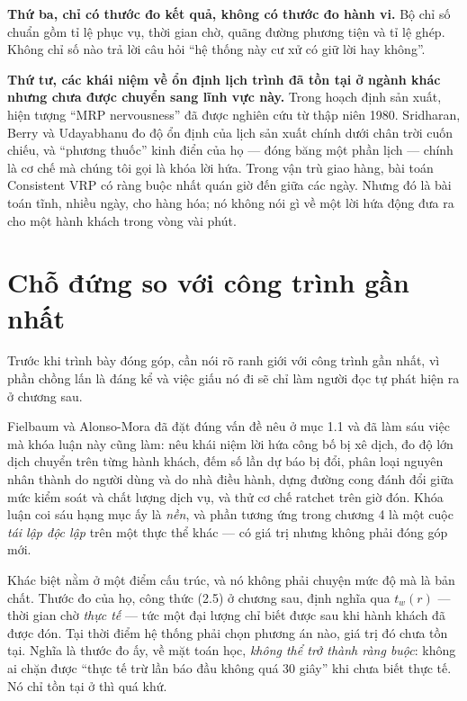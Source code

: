 \textbf{Thứ ba, chỉ có thước đo kết quả, không có thước đo hành vi.} Bộ chỉ số chuẩn gồm tỉ lệ
phục vụ, thời gian chờ, quãng đường phương tiện và tỉ lệ ghép. Không chỉ số nào trả lời câu hỏi
``hệ thống này cư xử có giữ lời hay không''.

\textbf{Thứ tư, các khái niệm về ổn định lịch trình đã tồn tại ở ngành khác nhưng chưa được
chuyển sang lĩnh vực này.} Trong hoạch định sản xuất, hiện tượng ``MRP nervousness'' đã được
nghiên cứu từ thập niên 1980. Sridharan, Berry và Udayabhanu \cite{sridharan1987} đo độ ổn định
của lịch sản xuất chính dưới chân trời cuốn chiếu, và ``phương thuốc'' kinh điển của họ ---
đóng băng một phần lịch --- chính là cơ chế mà chúng tôi gọi là khóa lời hứa. Trong vận trù
giao hàng, bài toán Consistent VRP \cite{kovacs2014} có ràng buộc nhất quán giờ đến giữa các
ngày. Nhưng đó là bài toán tĩnh, nhiều ngày, cho hàng hóa; nó không nói gì về một lời hứa động
đưa ra cho một hành khách trong vòng vài phút.

\section{Chỗ đứng so với công trình gần nhất}

Trước khi trình bày đóng góp, cần nói rõ ranh giới với công trình gần nhất, vì phần chồng lấn
là đáng kể và việc giấu nó đi sẽ chỉ làm người đọc tự phát hiện ra ở chương sau.

Fielbaum và Alonso-Mora \cite{fielbaum2020} đã đặt đúng vấn đề nêu ở mục 1.1 và đã làm sáu việc
mà khóa luận này cũng làm: nêu khái niệm lời hứa công bố bị xê dịch, đo độ lớn dịch chuyển trên
từng hành khách, đếm số lần dự báo bị đổi, phân loại nguyên nhân thành do người dùng và do nhà
điều hành, dựng đường cong đánh đổi giữa mức kiểm soát và chất lượng dịch vụ, và thử cơ chế
ratchet trên giờ đón. Khóa luận coi sáu hạng mục ấy là \emph{nền}, và phần tương ứng trong
chương 4 là một cuộc \emph{tái lập độc lập} trên một thực thể khác --- có giá trị nhưng không
phải đóng góp mới.

Khác biệt nằm ở một điểm cấu trúc, và nó không phải chuyện mức độ mà là bản chất. Thước đo của
họ, công thức (2.5) ở chương sau, định nghĩa qua $t_w(r)$ --- thời gian chờ \emph{thực tế} ---
tức một đại lượng chỉ biết được sau khi hành khách đã được đón. Tại thời điểm hệ thống phải
chọn phương án nào, giá trị đó chưa tồn tại. Nghĩa là thước đo ấy, về mặt toán học, \emph{không
thể trở thành ràng buộc}: không ai chặn được ``thực tế trừ lần báo đầu không quá 30 giây'' khi
chưa biết thực tế. Nó chỉ tồn tại ở thì quá khứ.

